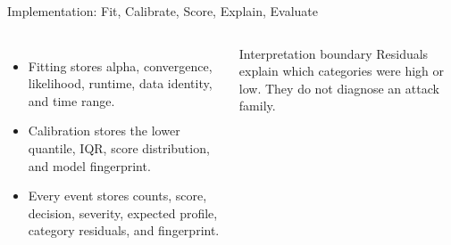\documentclass[aspectratio=169,10pt]{beamer}
\begin{document}
\begin{frame}{Implementation: Fit, Calibrate, Score, Explain, Evaluate}
\begin{columns}[T,onlytextwidth]
\centering
{}

\vspace{0.55cm}
\begin{itemize}
  \item Fitting stores alpha, convergence, likelihood, runtime, data identity,
  and time range.
  \item Calibration stores the lower quantile, IQR, score distribution, and
  model fingerprint.
  \item Every event stores counts, score, decision, severity, expected profile,
  category residuals, and fingerprint.
\end{itemize}

\begin{alertblock}{Interpretation boundary}
Residuals explain which categories were high or low. They do not diagnose an
attack family.
\end{alertblock}
\end{columns}
\end{frame}
\end{document}
